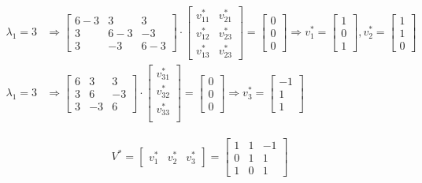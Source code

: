\documentclass[a4paper, spanish]{article}
\begin{document}
  \begin{align}
    \lambda_1 = 3 &\Rightarrow
    \begin{bmatrix}
      6-3 & 3 & 3 \\
      3 & 6-3 & -3 \\
      3 & -3 & 6-3
    \end{bmatrix}
    \cdot
    \begin{bmatrix}
      v_{11}^* & v_{21}^*\\
      v_{12}^* & v_{23}^*\\
      v_{13}^* & v_{23}^*
    \end{bmatrix}
    =
    \begin{bmatrix}
      0 \\
      0 \\
      0
    \end{bmatrix}
    \Rightarrow
    v_1^* =
    \begin{bmatrix}
      1 \\
      0 \\
      1
    \end{bmatrix},
    v_2^* =
    \begin{bmatrix}
      1 \\
      1 \\
      0
    \end{bmatrix}\\
    \lambda_1 = 3 &\Rightarrow
    \begin{bmatrix}
      6 & 3 & 3 \\
      3 & 6 & -3 \\
      3 & -3 & 6
    \end{bmatrix}
    \cdot
    \begin{bmatrix}
      v_{31}^* \\
      v_{32}^* \\
      v_{33}^* \\
    \end{bmatrix}
    =
    \begin{bmatrix}
      0 \\
      0 \\
      0
    \end{bmatrix}
    \Rightarrow
    v_3^* =
    \begin{bmatrix}
      -1 \\
      1 \\
      1
    \end{bmatrix}
  \end{align}

  \begin{align}
    V^* =
    \begin{bmatrix}
      v_1^* & v_2^* & v_3^*
    \end{bmatrix} =
    \begin{bmatrix}
      1 & 1 & -1 \\
      0 & 1 & 1 \\
      1 & 0 & 1
    \end{bmatrix}
  \end{align}
\end{document}
